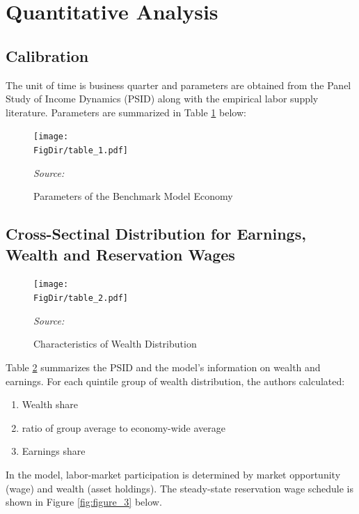 \documentclass[titlepage,letterpaper]{\econtex}
\begin{document}
\section{Quantitative Analysis}\label{sec:QuantAnalysis}

\subsection{Calibration}\label{sec:Calibration}

The unit of time is business quarter and parameters are obtained from the Panel Study of Income Dynamics (PSID) along with the empirical labor supply literature. Parameters are summarized in Table \ref{fig:table_1} below:

     \begin{figure}[ht]
    {\centering \texttt{[image: \\FigDir/table\_1.pdf]}}
    \caption{Parameters of the Benchmark Model Economy}
    \footnotesize {{\emph{Source:}} {\citet{changkim2007}}}
    \label{fig:table_1}
  \end{figure}

  \subsection{Cross-Sectinal Distribution for Earnings, Wealth and Reservation Wages}\label{sec:CrossSectional}

       \begin{figure}[ht]
    {\centering \texttt{[image: \\FigDir/table\_2.pdf]}}
    \caption{Characteristics of Wealth Distribution}
    \footnotesize {{\emph{Source:}} {\citet{changkim2007}}}
    \label{fig:table_2}
  \end{figure}
  
Table \ref{fig:table_2}  summarizes the PSID and the model's information on wealth and earnings. For each quintile group of wealth distribution, the authors calculated:

\begin{enumerate}
\item Wealth share
\item ratio of group average to economy-wide average
\item Earnings share
\end{enumerate}

In the model, labor-market participation is determined by market opportunity (wage) and wealth (asset holdings). The steady-state reservation wage schedule is shown in Figure \ref{fig:figure_3}  below.
\end{document}
